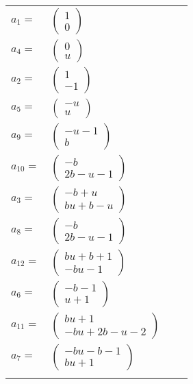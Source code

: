\documentclass[1p]{elsarticle_modified}
\theoremstyle{definition}
\begin{document}
\begin{tabular}{m{7pt} m{180pt} m{7pt} m{180pt} }
\flushright $a_{1}=$&$\begin{pmatrix}1\\0\end{pmatrix}$ \\
\flushright $a_{4}=$&$\begin{pmatrix}0\\u\end{pmatrix}$ \\
\flushright $a_{2}=$&$\begin{pmatrix}1\\-1\end{pmatrix}$ \\
\flushright $a_{5}=$&$\begin{pmatrix}- u\\u\end{pmatrix}$ \\
\flushright $a_{9}=$&$\begin{pmatrix}- u-1\\b\end{pmatrix}$ \\
\flushright $a_{10}=$&$\begin{pmatrix}- b\\2 b- u-1\end{pmatrix}$ \\
\flushright $a_{3}=$&$\begin{pmatrix}- b+u\\b u+b- u\end{pmatrix}$ \\
\flushright $a_{8}=$&$\begin{pmatrix}- b\\2 b- u-1\end{pmatrix}$ \\
\flushright $a_{12}=$&$\begin{pmatrix}b u+b+1\\- b u-1\end{pmatrix}$ \\
\flushright $a_{6}=$&$\begin{pmatrix}- b-1\\u+1\end{pmatrix}$ \\
\flushright $a_{11}=$&$\begin{pmatrix}b u+1\\- b u+2 b- u-2\end{pmatrix}$ \\
\flushright $a_{7}=$&$\begin{pmatrix}- b u- b-1\\b u+1\end{pmatrix}$\\&\end{tabular}
\end{document}
